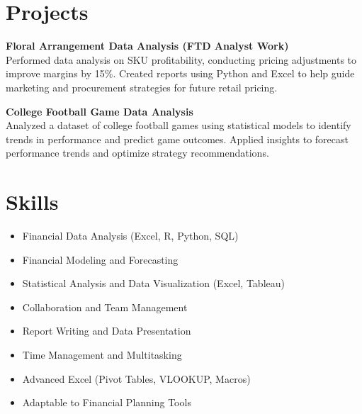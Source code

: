 \documentclass[10pt]{article}
\begin{document}
\vspace{-10pt}
\section*{Projects}
\vspace{0pt}



\textbf{Floral Arrangement Data Analysis (FTD Analyst Work)} \\
Performed data analysis on SKU profitability, conducting pricing adjustments to improve margins by 15\%. Created reports using Python and Excel to help guide marketing and procurement strategies for future retail pricing.

\vspace{0pt}
\textbf{College Football Game Data Analysis} \\
Analyzed a dataset of college football games using statistical models to identify trends in performance and predict game outcomes. Applied insights to forecast performance trends and optimize strategy recommendations.

\vspace{-10pt}
\section*{Skills}
\vspace{0pt}
\begin{multicols}{2}
\begin{itemize}[noitemsep,nosep]
    \item Financial Data Analysis (Excel, R, Python, SQL)
    \item Financial Modeling and Forecasting
    \item Statistical Analysis and Data Visualization (Excel, Tableau)
    \item Collaboration and Team Management
    \item Report Writing and Data Presentation
    \item Time Management and Multitasking
    \item Advanced Excel (Pivot Tables, VLOOKUP, Macros)
    \item Adaptable to Financial Planning Tools
\end{itemize}

\end{multicols}
\end{document}
